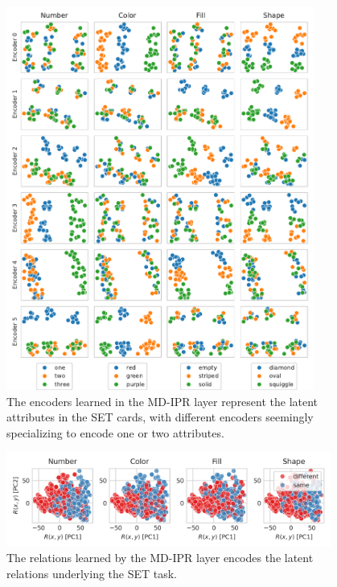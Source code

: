 \begin{figure}
    \centering
    \includegraphics[width=0.9\textwidth]{figs/representation_analysis/mdipr_encoders_rep.pdf}
    \caption{The encoders learned in the MD-IPR layer represent the latent attributes in the SET cards, with different encoders seemingly specializing to encode one or two attributes.}\label{fig:mdirp_encoders_rep}
\end{figure}

\begin{figure}
    \centering
    \includegraphics[width=0.95\textwidth]{figs/representation_analysis/mdipr_rel_rep.png}
    \caption{The relations learned by the MD-IPR layer encodes the latent relations underlying the SET task.}\label{fig:mdipr_rel_rep}
\end{figure}

